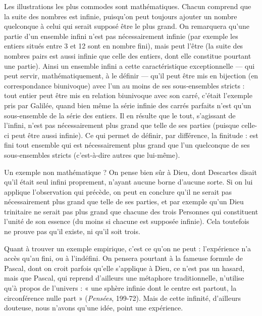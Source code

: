 Les illustrations les plus commodes sont mathématiques. Chacun comprend
que la suite des nombres est infinie, puisqu'on peut toujours ajouter un
nombre quelconque à celui qui serait supposé être le plus grand. On remarquera
qu’une partie d’un ensemble infini n’est pas nécessairement infinie (par
exemple les entiers situés entre 3 et 12 sont en nombre fini), mais peut l’être (la
suite des nombres pairs est aussi infinie que celle des entiers, dont elle constitue
pourtant une partie). Ainsi un ensemble infini a cette caractéristique exceptionnelle
— qui peut servir, mathématiquement, à le définir — qu’il peut être mis en
bijection (en correspondance biunivoque) avec l’un au moins de ses sous-ensembles
stricts : tout entier peut être mis en relation biunivoque avec son
carré, c'était l’exemple pris par Galilée, quand bien même la série infinie des
carrés parfaits n’est qu’un sous-ensemble de la série des entiers. Il en résulte que
le tout, s'agissant de l'infini, n’est pas nécessairement plus grand que telle de ses
parties (puisque celle-ci peut être aussi infinie). Ce qui permet de définir, par
différence, la finitude : est fini tout ensemble qui est nécessairement plus grand
que l’un quelconque de ses sous-ensembles stricts (c’est-à-dire autres que lui-même).

Un exemple non mathématique ? On pense bien sûr à Dieu, dont Descartes
disait qu'il était seul infini proprement, n’ayant aucune borne d'aucune
sorte. Si on lui applique l'observation qui précède, on peut en conclure qu’il ne
serait pas nécessairement plus grand que telle de ses parties, et par exemple
qu’un Dieu trinitaire ne serait pas plus grand que chacune des trois Personnes
qui constituent l’unité de son essence (du moins si chacune est supposée
infinie). Cela toutefois ne prouve pas qu’il existe, ni qu’il soit trois.

Quant à trouver un exemple empirique, c’est ce qu’on ne peut : l’expérience
n’a accès qu’au fini, ou à l’indéfini. On pensera pourtant à la fameuse
formule de Pascal, dont on croit parfois qu’elle s’applique à Dieu, ce n’est pas
un hasard, mais que Pascal, qui reprend d’ailleurs une métaphore traditionnelle,
n'utilise qu’à propos de l’univers : « une sphère infinie dont le centre est
partout, la circonférence nulle part » ({\it Pensées}, 199-72). Mais de cette infinité,
d’ailleurs douteuse, nous n’avons qu’une idée, point une expérience.


